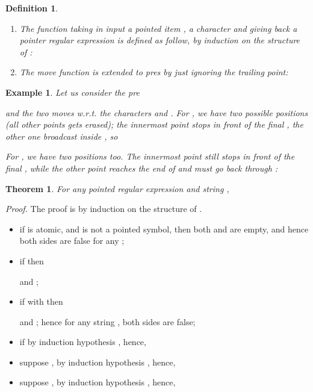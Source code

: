 \documentclass[preprint]{sigplanconf}
\newcounter{item}
\newtheorem{theorem}[item]{Theorem}
\newtheorem{definition}[item]{Definition}
\newtheorem{example}[item]{Example}
\newenvironment{proof}{\begin{trivlist}\item[]{\em Proof.}}{\end{trivlist}}
\begin{document}
\begin{definition}\label{move}\
\begin{enumerate}
\item The function  taking in input a pointed item 
, a character  and giving back a pointer regular
expression is defined as follow, by induction on the structure of
: 

\item The move function is extended to pres by just ignoring the trailing
point: 

\end{enumerate}
\end{definition}

\begin{example}
Let us consider the pre 

and the two moves w.r.t. the characters
 and . For , we have two possible positions (all other
points gets erased); the innermost point stops in front of the final ,
the other one broadcast inside  , so 

For , we have two positions too. The innermost point still
stops in front of the final , while the other point reaches the end
of  and must go back through  :

\end{example}

\begin{theorem} 
\label{theo:move}
For any pointed regular expression  and string
, 

\end{theorem}

\begin{proof}
The proof is by induction on the structure of . 
\begin{itemize}
\item if  is atomic, and  is not a pointed symbol, then
both  and  are empty, and hence both
sides are false for any ;
\item if  then 

and ; 
\item if  with  then 

and ; hence for any string , both sides 
are false; 
\item if 
by induction hypothesis
,
hence, 


\item suppose ,
by induction hypothesis
,
hence, 


\item suppose ,
by induction hypothesis
,
hence, 

\end{itemize}
\end{proof}
\end{document}
